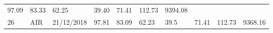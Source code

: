 \documentclass[
  11pt,
]{article}
\begin{document}
\begin{longtable}[]{@{}llllllllll@{}}
\begin{minipage}[t]{0.06\columnwidth}
97.09\strut
\end{minipage} & \begin{minipage}[t]{0.06\columnwidth}\raggedright
83.33\strut
\end{minipage} & \begin{minipage}[t]{0.06\columnwidth}\raggedright
62.25\strut
\end{minipage} & \begin{minipage}[t]{0.06\columnwidth}\raggedright
39.40\strut
\end{minipage} & \begin{minipage}[t]{0.06\columnwidth}\raggedright
71.41\strut
\end{minipage} & \begin{minipage}[t]{0.13\columnwidth}\raggedright
112.73\strut
\end{minipage} & \begin{minipage}[t]{0.08\columnwidth}\raggedright
9394.08\strut
\end{minipage}\tabularnewline
\begin{minipage}[t]{0.04\columnwidth}\raggedright
26\strut
\end{minipage} & \begin{minipage}[t]{0.09\columnwidth}\raggedright
AIR\strut
\end{minipage} & \begin{minipage}[t]{0.10\columnwidth}\raggedright
21/12/2018\strut
\end{minipage} & \begin{minipage}[t]{0.06\columnwidth}\raggedright
97.81\strut
\end{minipage} & \begin{minipage}[t]{0.06\columnwidth}\raggedright
83.09\strut
\end{minipage} & \begin{minipage}[t]{0.06\columnwidth}\raggedright
62.23\strut
\end{minipage} & \begin{minipage}[t]{0.06\columnwidth}\raggedright
39.5\strut
\end{minipage} & \begin{minipage}[t]{0.06\columnwidth}\raggedright
71.41\strut
\end{minipage} & \begin{minipage}[t]{0.13\columnwidth}\raggedright
112.73\strut
\end{minipage} & \begin{minipage}[t]{0.08\columnwidth}\raggedright
9368.16\strut
\end{minipage}\tabularnewline

\end{longtable}
\end{document}
